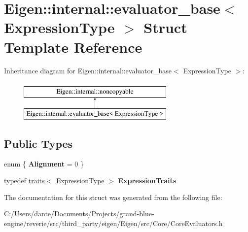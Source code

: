 \hypertarget{struct_eigen_1_1internal_1_1evaluator__base}{}\section{Eigen\+::internal\+::evaluator\+\_\+base$<$ Expression\+Type $>$ Struct Template Reference}
\label{struct_eigen_1_1internal_1_1evaluator__base}
Inheritance diagram for Eigen\+::internal\+::evaluator\+\_\+base$<$ Expression\+Type $>$\+:\begin{figure}[H]
\begin{center}
\leavevmode
\includegraphics[height=2.000000cm]{struct_eigen_1_1internal_1_1evaluator__base}
\end{center}
\end{figure}
\subsection*{Public Types}
\begin{DoxyCompactItemize}
\item 
\mbox{\label{struct_eigen_1_1internal_1_1evaluator__base_afd8030506905357326f6c528d905d975}} 
enum \{ {\bfseries Alignment} = 0
 \}
\item 
\mbox{\label{struct_eigen_1_1internal_1_1evaluator__base_acb94884a759bb59a96c8c3eea1e50c10}} 
typedef \mbox{\hyperlink{struct_eigen_1_1internal_1_1traits}{traits}}$<$ Expression\+Type $>$ {\bfseries Expression\+Traits}
\end{DoxyCompactItemize}


The documentation for this struct was generated from the following file\+:\begin{DoxyCompactItemize}
\item 
C\+:/\+Users/dante/\+Documents/\+Projects/grand-\/blue-\/engine/reverie/src/third\+\_\+party/eigen/\+Eigen/src/\+Core/Core\+Evaluators.\+h\end{DoxyCompactItemize}
